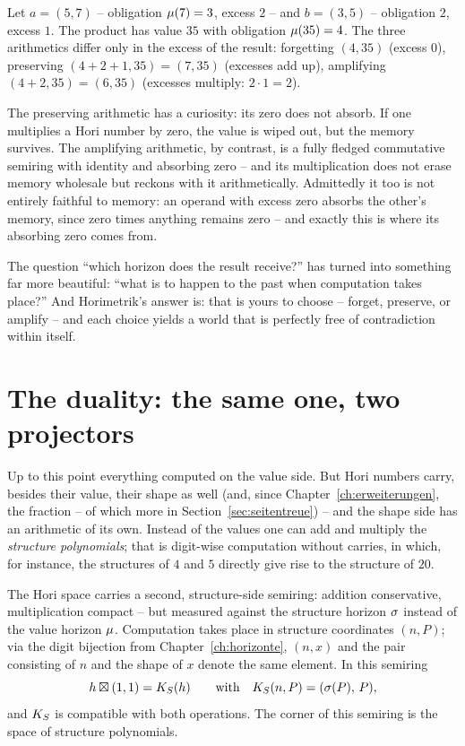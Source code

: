 \begin{beispiel}
Let $a=(5,7)$ -- obligation $\mu(7)=3$, excess $2$ -- and
$b=(3,5)$ -- obligation $2$, excess $1$. The product has value $35$
with obligation $\mu(35)=4$. The three arithmetics differ only in
the excess of the result: forgetting $(4,35)$ (excess $0$),
preserving $(4{+}2{+}1,35)=(7,35)$ (excesses add up),
amplifying $(4{+}2,35)=(6,35)$ (excesses multiply:
$2\cdot1=2$).
\end{beispiel}

The preserving arithmetic has a curiosity: its zero does not
absorb. If one multiplies a Hori number by zero, the value is wiped
out, but the memory survives. The amplifying arithmetic, by
contrast, is a fully fledged commutative semiring with identity and
absorbing zero -- and its multiplication does not erase memory
wholesale but reckons with it arithmetically. Admittedly it too is
not entirely faithful to memory: an operand with excess zero
absorbs the other's memory, since zero times anything remains
zero -- and exactly this is where its absorbing zero comes from.

\begin{oberflaeche}
The question ``which horizon does the result receive?'' has turned
into something far more beautiful: ``what is to happen to the past
when computation takes place?'' And Horimetrik's answer is: that is
yours to choose -- forget, preserve, or amplify -- and each choice
yields a world that is perfectly free of contradiction within
itself.
\end{oberflaeche}

\section{The duality: the same one, two projectors}

Up to this point everything computed on the value side. But Hori
numbers carry, besides their value, their shape as well (and, since
Chapter~\ref{ch:erweiterungen}, the fraction -- of which more in
Section~\ref{sec:seitentreue}) -- and the shape side has
an arithmetic of its own. Instead of the
values one can add and multiply the \emph{structure polynomials};
that is digit-wise computation without carries, in which, for
instance, the structures of $4$ and $5$ directly give rise to the
structure of $20$.

\begin{satz}\label{satz:dualitaet}
The Hori space carries a second, structure-side semiring: addition
conservative, multiplication compact -- but measured against the
structure horizon $\sigma$ instead of the value horizon $\mu$.
Computation takes place in structure coordinates $(n,P)$; via the
digit bijection from Chapter~\ref{ch:horizonte}, $(n,x)$ and the
pair consisting of $n$ and the shape of $x$ denote the same
element. In this semiring
\[
h\boxtimes(1,1)=K_S(h)
\qquad\text{with}\quad
K_S(n,P)=(\sigma(P),\,P),
\]
and $K_S$ is compatible with both operations. The corner of this
semiring is the space of structure polynomials.
\end{satz}

